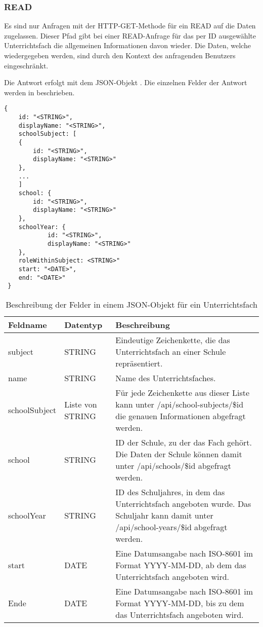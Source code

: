\subsubsection{READ}
\label{sec:rest:api:subjects:id:read}
Es sind nur Anfragen mit der HTTP-GET-Methode für ein READ auf die Daten zugelassen.
Dieser Pfad gibt bei einer READ-Anfrage für das per ID ausgewählte Unterrichtsfach die allgemeinen Informationen davon wieder.
Die Daten, welche wiedergegeben werden, sind durch den Kontext des anfragenden Benutzers eingeschränkt.

Die Antwort erfolgt mit dem JSON-Objekt . 
Die einzelnen Felder der Antwort werden in  beschrieben.


\begin{lstlisting}[caption={JSON-Antwort für einen GET-Aufruf des Pfads /api/subjects/\$id},label={lst:code:rest:api:subjects:id:read:ret},frame=tlrb]
{
    id: "<STRING>",
    displayName: "<STRING>",
    schoolSubject: [
    {
        id: "<STRING>",
        displayName: "<STRING>"
    },
    ...
    ]
    school: {
        id: "<STRING>",
        displayName: "<STRING>"
    },
    schoolYear: {
            id: "<STRING>",
            displayName: "<STRING>"
    },
    roleWithinSubject: <STRING>"
    start: "<DATE>",
    end: "<DATE>"
 }
\end{lstlisting}

\begin{longtable}{|p{}|p{}|p{}|}
		\caption{Beschreibung der Felder in einem JSON-Objekt für ein Unterrichtsfach}
\endfoot
		\caption{Beschreibung der Felder in einem JSON-Objekt für ein Unterrichtsfach}
		\label{tab:rest:api:subjects:id:read:ret}
\endlastfoot 
\hline
			\textbf{Feldname} & \textbf{Datentyp} & \textbf{Beschreibung} \\ \hline
\endhead
subject & STRING & Eindeutige Zeichenkette, die das Unterrichtsfach an einer Schule repräsentiert.  \\ \hline
name & STRING & Name des Unterrichtsfaches. \\ \hline
schoolSubject & Liste von STRING & Für jede Zeichenkette aus dieser Liste kann unter /api/school-subjects/\$id die genauen Informationen abgefragt werden. \\ \hline
school & STRING & ID der Schule, zu der das Fach gehört. Die Daten der Schule können damit unter /api/schools/\$id abgefragt werden. \\ \hline
schoolYear & STRING & ID des Schuljahres, in dem das Unterrichtsfach angeboten wurde. Das Schuljahr kann damit unter /api/school-years/\$id abgefragt werden. \\ \hline
start & DATE & Eine Datumsangabe nach ISO-8601 im Format YYYY-MM-DD, ab dem das Unterrichtsfach angeboten wird.  \\ \hline
Ende & DATE & Eine Datumsangabe nach ISO-8601 im Format YYYY-MM-DD, bis zu dem das Unterrichtsfach angeboten wird. \\ \hline
\end{longtable}
